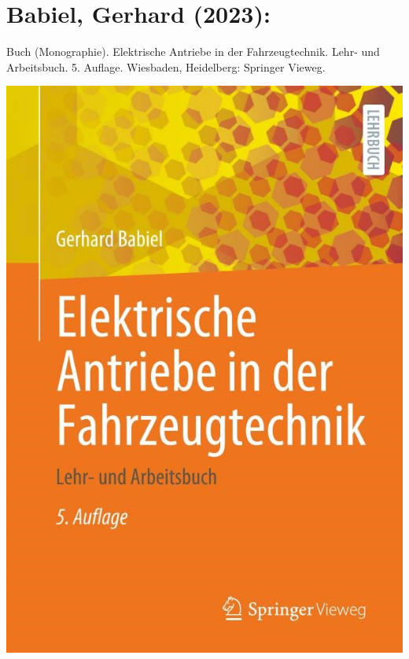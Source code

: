 \section*{Babiel, Gerhard (2023):}
Buch (Monographie). Elektrische Antriebe in der Fahrzeugtechnik. Lehr- und Arbeitsbuch.
5. Auflage. Wiesbaden, Heidelberg: Springer Vieweg.	
\begin{minipage}{0.5\textwidth}
	\includegraphics[width=\linewidth]{../Appendix/Literaturverzeichnis/img/Babiel.jpg}
\end{minipage}
\hfill
